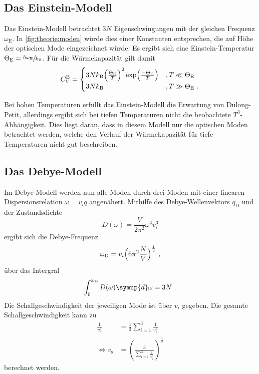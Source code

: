 \subsection{Das Einstein-Modell}
\label{sec:theorie:einstein}

    Das Einstein-Modell betrachtet $3N$ Eigenschwingungen mit der gleichen Frequenz $\omega_\text{E}$.
    In \autoref{fig:theorie:moden} würde dies einer Konstanten entsprechen,
    die auf Höhe der optischen Mode eingezeichnet würde.
    Es ergibt sich eine Einstein-Temperatur $\Theta_\text{E} = \sfrac{\hbar \omega_\text{E}}{k_\text{B}}$.
    Für die Wärmekapazität gilt damit
    \begin{equation*}
        C^{\text{E}}_V =
        \begin{cases}
            3Nk_\text{B} \Bigl(\frac{\Theta_\text{E}}{T}\Bigr)^2 \exp\Bigl(\frac{-\Theta_\text{E}}{T}\Bigr) & , T \ll \Theta_\text{E} \\
            3Nk_\text{B} & , T \gg \Theta_\text{E} \ .
        \end{cases}
    \end{equation*}

    Bei hohen Temperaturen erfüllt das Einstein-Modell die Erwartung von Dulong-Petit,
    allerdings ergibt sich bei tiefen Temperaturen nicht die beobachtete $T^3$-Abhängigkeit.
    Dies liegt daran,
    dass in diesem Modell nur die optischen Moden betrachtet werden,
    welche den Verlauf der Wärmekapazität für tiefe Temperaturen nicht gut beschreiben.

\subsection{Das Debye-Modell}
\label{sec:theorie:debye}

    Im Debye-Modell werden nun alle Moden durch drei Moden mit einer linearen Dispersionsrelation $\omega = v_i q$ angenähert.
    Mithilfe des Debye-Wellenvektors $q_\text{D}$ und der Zustandsdichte
    \begin{equation*}
        D(\omega) = \frac{V}{2 \pi^2}{\omega^3}{v^3_i}
    \end{equation*}
    ergibt sich die Debye-Frequenz
    \begin{equation}
        \omega_\text{D} = v_i \Bigl(6 \pi^2 \frac{N}{V}\Bigr)^{\frac{1}{3}} \ ,
        \label{eqn:theorie:omega_D}
    \end{equation}
    über das Intergral
    \begin{equation}
        \int_0^{\omega_\text{D}} D(\omega) \symup{d}\omega = 3N \ .
        \label{eqn:theorie:debye_int}
    \end{equation}
    Die Schallgeschwindigkeit der jeweiligen Mode ist über $v_i$ gegeben.
    Die gesamte Schallgeschwindigkeit kann zu
    \begin{align}
        \frac{1}{v^3_\text{s}} &= \frac{1}{3} \sum_{i=1}^3 \frac{1}{v^3_i} \\
        \Leftrightarrow
        v_\text{s} &= \left( \frac{3}{\sum_{i=1}^3 \frac{1}{v^3_i}} \right)^\frac{1}{3}
        \label{eqn:theorie:schallgeschwindigkeit}
    \end{align}
    berechnet werden.

